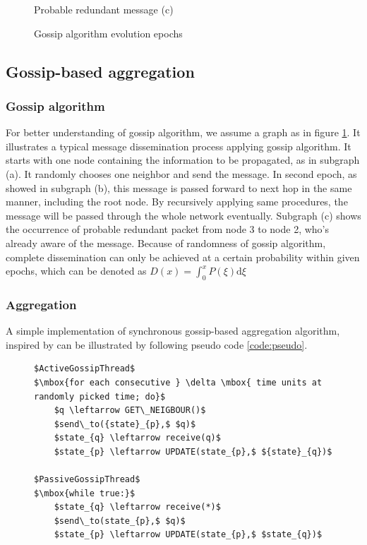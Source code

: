 \begin{figure}[h!]
\begin{center}
\begin{minipage}[c]{0.45\textwidth}
      Probable redundant message (c)
   	\end{minipage}
   \end{center}
   \caption{Gossip algorithm evolution epochs}
   \label{fig:epochs}
\end{figure}
\subsection{Gossip-based aggregation}

\subsubsection{Gossip algorithm}
For better understanding of gossip algorithm, we assume a graph as in figure \ref{fig:epochs}. It illustrates a typical message dissemination process applying gossip algorithm. It starts with one node containing the information to be propagated, as in subgraph (a). It randomly chooses one neighbor and send the message. In second epoch, as showed in subgraph (b), this message is passed forward to next hop in the same manner, including the root node. By recursively applying same procedures, the message will be passed through the whole network eventually. Subgraph (c) shows the occurrence of probable redundant packet from node 3 to node 2, who's already aware of the message. Because of randomness of gossip algorithm, complete dissemination can only be achieved at a certain probability within given epochs, which can be denoted as $D(x)=\int_0^x P(\xi)\mathrm{d}\xi$\\


\subsubsection{Aggregation}

A simple implementation of synchronous gossip-based aggregation algorithm, inspired by \cite{jelasity_gossip-based_2005} can be illustrated by following pseudo code \ref{code:pseudo}.
\begin{figure}[!h]
\begin{lstlisting}[caption={Pseudo Code for gossip-based aggregation}, label=code:pseudo, mathescape=true, captionpos=b]
$ActiveGossipThread$
$\mbox{for each consecutive } \delta \mbox{ time units at randomly picked time; do}$
    $q \leftarrow GET\_NEIGBOUR()$
    $send\_to({state}_{p},$ $q)$
    $state_{q} \leftarrow receive(q)$
    $state_{p} \leftarrow UPDATE(state_{p},$ ${state}_{q})$

$PassiveGossipThread$
$\mbox{while true:}$
    $state_{q} \leftarrow receive(*)$
    $send\_to(state_{p},$ $q)$
    $state_{p} \leftarrow UPDATE(state_{p},$ $state_{q})$
\end{lstlisting}
\end{figure}

